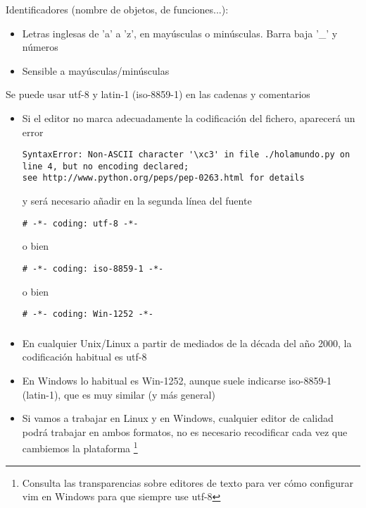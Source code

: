 \documentclass[ucs]{beamer}
\begin{document}
\begin{frame}[fragile]

Identificadores (nombre de objetos, de funciones...):
\begin{itemize}
\item
Letras inglesas de 'a' a 'z', en mayúsculas o minúsculas. Barra baja '\_' y números
\item Sensible a mayúsculas/minúsculas
\end{itemize}





Se puede usar utf-8 y latin-1 (iso-8859-1) en las cadenas y comentarios
\begin{itemize}
\item
Si el editor no marca adecuadamente la codificación del fichero, 
aparecerá un error
  \begin{scriptsize}
  \begin{verbatim}
SyntaxError: Non-ASCII character '\xc3' in file ./holamundo.py on 
line 4, but no encoding declared; 
see http://www.python.org/peps/pep-0263.html for details
  \end{verbatim}
  \end{scriptsize}
y será necesario añadir
en la segunda línea del fuente
  \begin{scriptsize}
  \begin{verbatim}
# -*- coding: utf-8 -*-
  \end{verbatim}
  \end{scriptsize}
o bien
  \begin{scriptsize}
  \begin{verbatim}
# -*- coding: iso-8859-1 -*-
  \end{verbatim}
  \end{scriptsize}
o bien
  \begin{scriptsize}
  \begin{verbatim}
# -*- coding: Win-1252 -*-
  \end{verbatim}
  \end{scriptsize}
\end{itemize}
\end{frame}


\begin{frame}[fragile]
\frametitle{}
\begin{itemize}
\item
En cualquier Unix/Linux a partir de mediados de la década del año 2000, 
la codificación habitual es utf-8
\item
En Windows lo habitual es Win-1252, aunque suele indicarse iso-8859-1 (latin-1),
que es muy similar (y más general)
\item
Si vamos a trabajar en Linux y en Windows, cualquier editor de calidad
podrá trabajar en ambos formatos, no es necesario recodificar cada vez
que cambiemos la plataforma
\footnote{Consulta las transparencias sobre editores de texto
para ver cómo configurar vim en Windows para que siempre use utf-8}
\end{itemize}

\end{frame}
\end{document}
